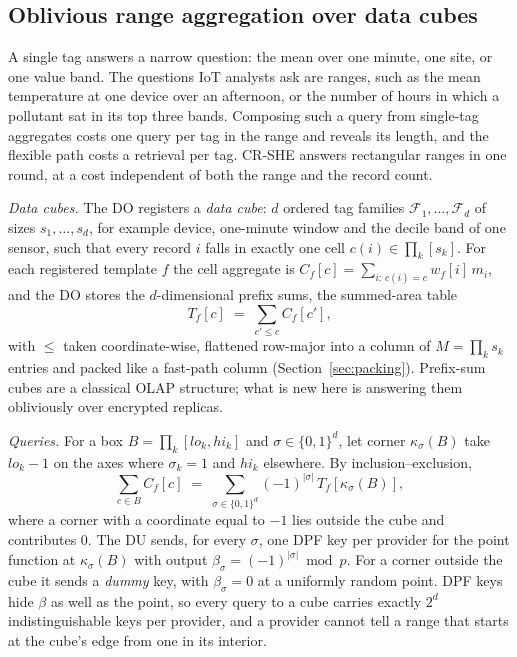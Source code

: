 \documentclass[a4paper,fleqn]{cas-sc}
\begin{document}
\subsection{Oblivious range aggregation over data cubes}
\label{sec:range}
A single tag answers a narrow question: the mean over one minute, one site, or
one value band. The questions IoT analysts ask are ranges, such as the mean
temperature at one device over an afternoon, or the number of hours in which a
pollutant sat in its top three bands. Composing such a query from single-tag
aggregates costs one query per tag in the range and reveals its length, and the
flexible path costs a retrieval per tag. CR-SHE answers rectangular ranges in
one round, at a cost independent of both the range and the record count.

\emph{Data cubes.} The DO registers a \emph{data cube}: $d$ ordered tag
families $\mathcal{F}_1,\dots,\mathcal{F}_d$ of sizes $s_1,\dots,s_d$, for
example device, one-minute window and the decile band of one sensor, such that
every record $i$ falls in exactly one cell $c(i)\in\prod_k[s_k]$. For each
registered template $f$ the cell aggregate is
$C_f[c]=\sum_{i:\,c(i)=c}w_f[i]\,m_i$, and the DO stores the $d$-dimensional
prefix sums, the summed-area table
\[
T_f[c] \;=\; \sum_{c'\le c} C_f[c'] ,
\]
with $\le$ taken coordinate-wise, flattened row-major into a column of
$M=\prod_k s_k$ entries and packed like a fast-path column
(Section~\ref{sec:packing}). Prefix-sum cubes are a classical OLAP structure;
what is new here is answering them obliviously over encrypted replicas.

\emph{Queries.} For a box $B=\prod_k[\mathit{lo}_k,\mathit{hi}_k]$ and
$\sigma\in\{0,1\}^d$, let corner $\kappa_\sigma(B)$ take $\mathit{lo}_k-1$ on
the axes where $\sigma_k=1$ and $\mathit{hi}_k$ elsewhere. By
inclusion--exclusion,
\begin{equation}
\label{eq:ie}
\sum_{c\in B} C_f[c] \;=\; \sum_{\sigma\in\{0,1\}^d} (-1)^{|\sigma|}\,
T_f[\kappa_\sigma(B)],
\end{equation}
where a corner with a coordinate equal to $-1$ lies outside the cube and
contributes $0$. The DU sends, for every $\sigma$, one DPF key per provider
for the point function at $\kappa_\sigma(B)$ with output
$\beta_\sigma=(-1)^{|\sigma|}\bmod p$. For a corner outside the cube it sends a
\emph{dummy} key, with $\beta_\sigma=0$ at a uniformly random point. DPF keys
hide $\beta$ as well as the point, so every query to a cube carries exactly
$2^d$ indistinguishable keys per provider, and a provider cannot tell a range
that starts at the cube's edge from one in its interior.
\end{document}

